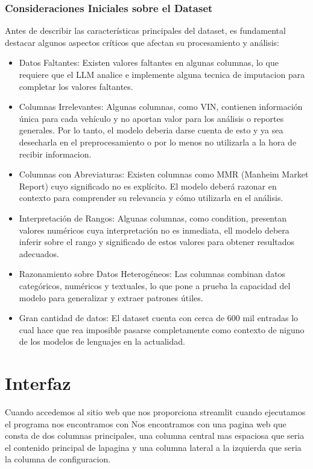 \subsubsection{Consideraciones Iniciales sobre el Dataset}
Antes de describir las características principales del dataset, es fundamental destacar algunos aspectos críticos que afectan su procesamiento y análisis:
\begin{itemize}
	\item{Datos Faltantes:}
	Existen valores faltantes en algunas columnas, lo que requiere que el LLM analice e implemente alguna tecnica de imputacion para completar los valores faltantes.
	
	\item{Columnas Irrelevantes:}
	Algunas columnas, como VIN, contienen información única para cada vehículo y no aportan valor para los análisis o reportes generales. Por lo tanto, el modelo deberia darse cuenta de esto y ya sea desecharla en el preprocesamiento o por lo menos no utilizarla a la hora de recibir informacion.
	
	\item{Columnas con Abreviaturas:}
	Existen columnas como MMR (Manheim Market Report) cuyo significado no es explícito. El modelo deberá razonar en contexto para comprender su relevancia y cómo utilizarla en el análisis.
	
	\item{Interpretación de Rangos:}
	Algunas columnas, como condition, presentan valores numéricos cuya interpretación no es inmediata, ell modelo debera inferir sobre el rango y significado de estos valores para obtener resultados adecuados.
	
	\item{Razonamiento sobre Datos Heterogéneos:}
	Las columnas combinan datos categóricos, numéricos y textuales, lo que pone a prueba la capacidad del modelo para generalizar y extraer patrones útiles.
	
	\item{Gran cantidad de datos:}
	El dataset cuenta con cerca de 600 mil entradas lo cual hace que rea imposible pasarse completamente como contexto de niguno de los modelos de lenguajes en la actualidad.
\end{itemize}

\section{Interfaz}
Cuando accedemos al sitio web que nos proporciona streamlit cuando ejecutamos el programa nos encontramos con Nos encontramos con una pagina web que consta de dos columnas principales, una columna central mas espaciosa que seria el contenido principal de lapagina y una columna lateral a la izquierda que seria la columna de configuracion.

